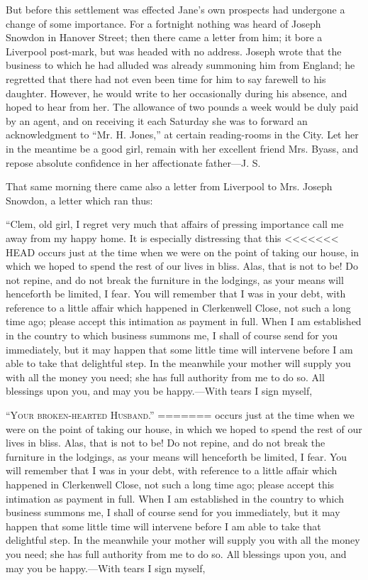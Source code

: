 But before this settlement was effected Jane's own prospects had
undergone a change of some importance. For a fortnight nothing was heard
of Joseph Snowdon in Hanover {}Street; then there came a letter from
him; it bore a Liverpool post-mark, but was headed with no address.
Joseph wrote that the business to which he had alluded was already
summoning him from England; he regretted that there had not even been
time for him to say farewell to his daughter. However, he would write to
her occasionally during his absence, and hoped to hear from her. The
allowance of two pounds a week would be duly paid by an agent, and on
receiving it each Saturday she was to forward an acknowledgment to ``Mr.
H. Jones,'' at certain reading-rooms in the City. Let her in the
meantime be a good girl, remain with her excellent friend Mrs. Byass,
and repose absolute confidence in her affectionate father---J. S.

That same morning there came also a letter from Liverpool to Mrs. Joseph
Snowdon, a letter which ran thus:

``Clem, old girl, I regret very much that affairs of pressing importance
call me away from my happy home. It is especially distressing that this
<<<<<<< HEAD
occurs just at the time when we {\protect\hypertarget{238}{}{}}were on
the point of taking our house, in which we hoped to spend the rest of
our lives in bliss. Alas, that is not to be! Do not repine, and do not
break the furniture in the lodgings, as your means will henceforth be
limited, I fear. You will remember that I was in your debt, with
reference to a little affair which happened in Clerkenwell Close, not
such a long time ago; please accept this intimation as payment in full.
When I am established in the country to which business summons me, I
shall of course send for you immediately, but it may happen that some
little time will intervene before I am able to take that delightful
step. In the meanwhile your mother will supply you with all the money
you need; she has full authority from me to do so. All blessings upon
you, and may you be happy.---With tears I sign myself,

\textsc{``Your broken-hearted Husband.''}{}
=======
occurs just at the time when we {}were on the point of taking our house,
in which we hoped to spend the rest of our lives in bliss. Alas, that is
not to be! Do not repine, and do not break the furniture in the
lodgings, as your means will henceforth be limited, I fear. You will
remember that I was in your debt, with reference to a little affair
which happened in Clerkenwell Close, not such a long time ago; please
accept this intimation as payment in full. When I am established in the
country to which business summons me, I shall of course send for you
immediately, but it may happen that some little time will intervene
before I am able to take that delightful step. In the meanwhile your
mother will supply you with all the money you need; she has full
authority from me to do so. All blessings upon you, and may you be
happy.---With tears I sign myself,

